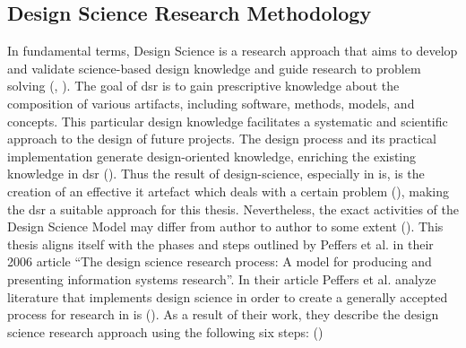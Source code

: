 

\subsection{Design Science Research Methodology}

In fundamental terms, Design Science is a research approach that aims to develop and validate science-based design knowledge and guide research to problem solving (\cite{Hevner.2004}, \cite{Dresch.2015}). The goal of \ac{dsr} is to gain prescriptive knowledge about the composition of various artifacts, including software, methods, models, and concepts. This particular design knowledge facilitates a systematic and scientific approach to the design of future projects. The design process and its practical implementation generate design-oriented knowledge, enriching the existing knowledge in \ac{dsr} (\cite{Hevner.2004}). Thus the result of design-science, especially in \ac{is}, is the creation of an effective \ac{it} artefact which deals with a certain problem (\cite{Hevner.2004}), making the \ac{dsr} a suitable approach for this thesis. Nevertheless, the exact activities of the Design Science Model may differ from author to author to some extent (\cite{Fulcher.1996}). This thesis aligns itself with the phases and steps outlined by Peffers et al. in their 2006 article \enquote{The design science research process: A model for producing and presenting information systems research}. In their article Peffers et al. analyze literature that implements design science in order to create a generally accepted process for research in \ac{is} (\cite{Peffers.2006}). As a result of their work, they describe the design science research approach using the following six steps: (\cite{Peffers.2006}) 

